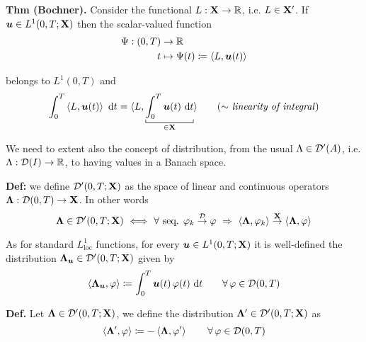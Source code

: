 \textbf{Thm (Bochner).} Consider the functional $L:\mathbf{X}\to \mathbb{R}$, i.e. $L\in \mathbf{X}'$. If $\bm u \in L^1(0,T;\mathbf{X})$ then the scalar-valued function
\vspace{-0.5em}
\begin{align*}
\Psi:(0,T)&\to\mathbb{R} \\
t &\mapsto \Psi(t)\coloneq \left\langle L,\bm u(t) \right\rangle
\end{align*}

\vspace{-0.5em}

belongs to $L^1(0,T)$ and 
\vspace{-0.5em}
\begin{equation*}
\int_0^T \sca{L,\bm u(t)} \dt = \langle L,\underbracket[0,5pt]{\int_0^T \bm u(t)\dt}_{\in\Xv} \rangle \tag{$\sim$ \emph{linearity of integral}}
\end{equation*}

\noindent\rlap{\rule[1.5ex]{0.495\textwidth}{.2pt}}

\newcolumn

We need to extent also the concept of distribution, from the usual $\Lambda\in\mathcal{D}'(A)$, i.e. $\Lambda:\mathcal{D}(I)\to\mathbb{R}$, to having values in a Banach space. 

\smallskip

\textbf{Def:} we define $\mathcal{D}'(0,T;\mathbf{X})$ as the space of linear and continuous operators $\bm \Lambda:\mathcal{D}(0,T)\to\mathbf{X}$. In other words
\begin{equation*}
\bm\Lambda\in\Dc'(0,T;\Xv)\ \Longleftrightarrow\ \forall\text{ seq. }\varphi_k\overset{\Dc}{\to}\varphi\ \Rightarrow\ \sca{\bm\Lambda,\varphi_k}\overset{\Xv}{\to}\sca{\bm\Lambda,\varphi}
\end{equation*}

As for standard $L^1_{\text{loc}}$ functions, for every $\bm u \in L^1(0,T;\mathbf{X})$ it is well-defined the distribution $\bm\Lambda_{\bm u}\in\mathcal{D}'(0,T;\mathbf{X})$ given by
\begin{equation*}
\left\langle \bm\Lambda_{\bm u},\varphi \right\rangle\coloneq \int_0^T \bm u(t)\, \varphi(t) \  \mathrm{d} t \qquad \forall\, \varphi \in \mathcal{D}(0,T)
\end{equation*}

\textbf{Def.} Let $\bm\Lambda\in\mathcal{D}'(0,T;\mathbf{X})$, we define the distribution $\bm\Lambda'\in\mathcal{D}'(0,T;\mathbf{X})$ as
\begin{equation*}
\left\langle \bm \Lambda',\varphi \right\rangle\coloneq -\left\langle \bm\Lambda,\varphi' \right\rangle\qquad \forall\,\varphi\in\mathcal{D}(0,T)
\end{equation*}

\noindent\rlap{\rule[1.5ex]{0.495\textwidth}{.2pt}}

